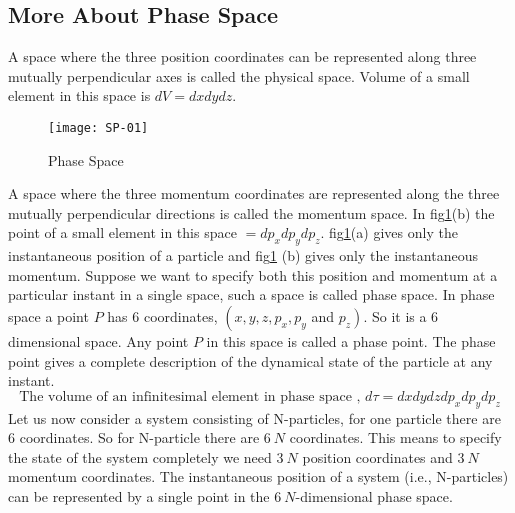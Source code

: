 \subsection{More About Phase Space}
 A space where the three position coordinates can be represented along three mutually perpendicular axes is called the physical space. Volume of a small element in this space is $d V=d x d y d z$.
\begin{figure}[H]
	\centering
	\texttt{[image: SP-01]}
	\caption{Phase Space} 
	\label{1}
\end{figure}
 A space where the three momentum coordinates are represented along the three mutually perpendicular directions is called the momentum space. In fig\ref{1}(b) the point of a small element in this space $=d p_{x} d p_{y} d p_{z}$. fig\ref{1}(a) gives only the instantaneous position of a particle and fig\ref{1}
 (b) gives only the instantaneous momentum. Suppose we want to specify both this position and momentum at a particular instant in a single space, such a space is called phase space. In phase space a point $P$ has 6 coordinates, $\left(x, y, z, p_{x}, p_{y}\right.$ and $\left.p_{z}\right)$. So it is a 6 dimensional space. Any point ${P}$ in this space is called a phase point. The phase point gives a complete description of the dynamical state of the particle at any instant.
 \begin{equation}
 \text{The volume of an }\text{infinitesimal element in phase space , }
 d \tau=d x d y d z d p_{x} d p_{y} d p_{z}
 \end{equation}
Let us now consider a system consisting of N-particles, for one particle there are 6 coordinates. So for N-particle there are $6 {~N}$ coordinates. This means to specify the state of the system completely we need $3 {~N}$ position coordinates and $3 {~N}$ momentum coordinates. The instantaneous position of a system (i.e., N-particles) can be represented by a single point in the $6 {~N}$-dimensional phase space.

